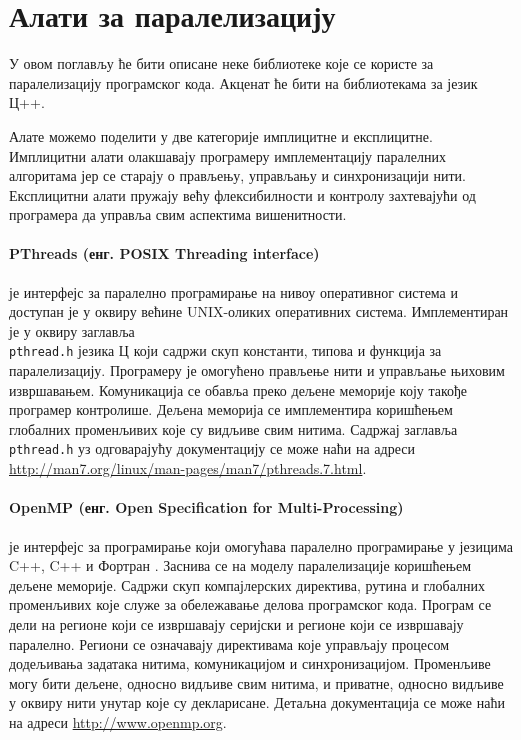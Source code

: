 \documentclass[12pt,oneside]{memoir}
\begin{document}
  \section{Алати за паралелизацију}
	У овом поглављу ће бити описане неке библиотеке које се користе за паралелизацију програмског кода. Акценат ће бити на библиотекама за језик Ц++. 
	
 Алате можемо поделити у две категорије имплицитне и експлицитне. Имплицитни алати олакшавају програмеру имплементацију паралелних алгоритама јер се старају о прављењу, управљању и синхронизацији нити. Експлицитни алати пружају већу флексибилности и контролу захтевајући од програмера да управља свим аспектима вишенитности.
	
\paragraph{ PThreads (енг. POSIX Threading interface)} је интерфејс за паралелно програмирање на нивоу оперативног система и доступан је у оквиру већине UNIX-оликих оперативних система. Имплементиран је у оквиру заглавља \\ \texttt{pthread.h} језика Ц који садржи скуп константи, типова и функција за паралелизацију. Програмеру је омогућено прављење нити и управљање њиховим извршавањем. Комуникација се обавља преко дељене меморије коју такође програмер контролише. Дељена меморија се имплементира коришћењем глобалних променљивих које су видљиве свим нитима. Садржај заглавља \texttt{pthread.h} уз одговарајућу документацију се може наћи на адреси \url{http://man7.org/linux/man-pages/man7/pthreads.7.html}.

\paragraph{OpenMP (енг. Open Specification for Multi-Processing)} је интерфејс за програмирање који омогућава паралелно програмирање у језицима C++, C++ и Фортран . Заснива се на моделу паралелизације коришћењем дељене меморије. Садржи скуп компајлерских директива, рутина и глобалних променљивих које служе за обележавање делова програмског кода. Програм се дели на регионе који се извршавају серијски и регионе који се извршавају паралелно. Региони се означавају директивама које управљају процесом додељивања задатака нитима, комуникацијом и синхронизацијом. Променљиве могу бити дељене, односно видљиве свим нитима, и приватне, односно видљиве у оквиру нити унутар које су декларисане. Детаљна документација се може наћи на адреси \url{http://www.openmp.org}. 
\end{document}
